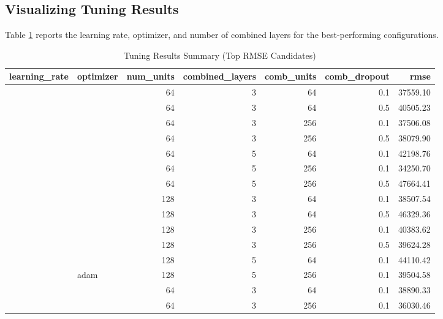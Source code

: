 \subsection{Visualizing Tuning Results}\label{visualizing-tuning-results}

Table \ref{tab:tuning-results-static} reports the learning rate, optimizer, and number of combined layers for the best-performing configurations.

\begin{table}
\centering
\caption{\label{tab:tuning-results-static}Tuning Results Summary (Top RMSE Candidates)}
\centering
\fontsize{7}{9}\selectfont
\begin{tabular}[t]{rlrrrrr}
\toprule
learning\_rate & optimizer & num\_units & combined\_layers & comb\_units & comb\_dropout & rmse\\
\midrule
 &  & 64 & 3 & 64 & 0.1 & 37559.10\\

 &  & 64 & 3 & 64 & 0.5 & 40505.23\\

 &  & 64 & 3 & 256 & 0.1 & 37506.08\\

 &  & 64 & 3 & 256 & 0.5 & 38079.90\\

 &  & 64 & 5 & 64 & 0.1 & 42198.76\\

 &  & 64 & 5 & 256 & 0.1 & 34250.70\\

 &  & 64 & 5 & 256 & 0.5 & 47664.41\\

 &  & 128 & 3 & 64 & 0.1 & 38507.54\\

 &  & 128 & 3 & 64 & 0.5 & 46329.36\\

 &  & 128 & 3 & 256 & 0.1 & 40383.62\\

 &  & 128 & 3 & 256 & 0.5 & 39624.28\\

 &  & 128 & 5 & 64 & 0.1 & 44110.42\\

 & \multirow{-13}{*}{\raggedright\arraybackslash adam} & 128 & 5 & 256 & 0.1 & 39504.58\\

 &  & 64 & 3 & 64 & 0.1 & 38890.33\\

 &  & 64 & 3 & 256 & 0.1 & 36030.46\\


\end{tabular}
\end{table}
